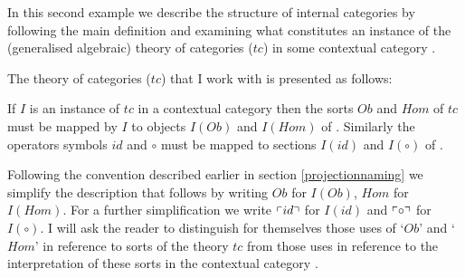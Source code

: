\newcommand{\compmorph}{\text{`$\circ$\kern-2pt'}}%

\newcommand{\ccplaceholder}{\rule[-0.2cm]{0cm}{0.6cm}\kern0.2cm}
\newcommand{\rightend}[1] { \kern-0.2cm\Rnode{#1} {\ccplaceholder} }

In this second example we describe the structure of internal categories by following the main definition and examining
what constitutes an instance of the (generalised algebraic) theory of categories ($tc$) in some 
 contextual category \catc.

The theory of categories ($tc$) that I work with is presented as follows:


\iffalse
\begin{gatrules}
\gatintros
\gatintroducing{Ob}
\isT{Ob} \\
\gatintroducing{Hom}
  \gatsingular{\ofT{x_1,x_2}{Ob}}{\isT{Hom(x_1,x_2)}} \\	
\gatintroducing{id}
  \gatsingular{\ofT{w}{Ob}}{\ofT{id(w)}{Hom(w,w)}} \\	
\gataxioms
\gatintroducing{  \gataxiomno{1} \\   \gataxiomno{2}}
\begin{gatgroup}{\ofT{f}{Hom(x_1,x_2)},\ \ofT{x_1,x_2}{Ob}}
    \gatleaf{}{id_{x_1} \circ f = f} \\
    \gatleaf{}{f \circ id_{x_2} = f}
\end{gatgroup} \\
\gatintroducing{ \gataxiomno{3} }
\gatsingular{\associativitypremisereversed}{(f \circ g) \circ h = f \circ (g \circ h)} 
\end{gatrules}
\fi

If $I$ is an instance of $tc$ in a contextual category \catcw then the sorts $Ob$ and $Hom$ of $tc$ 
must be mapped by $I$  to objects $I(Ob)$ and  $I(Hom)$ of \catc.
Similarly  the operators symbols
$id$ and $\circ$ must be mapped to sections $I(id)$ and $I(\circ)$ of \catc.

Following the convention described earlier in section \ref{projectionnaming} we simplify  
the description that follows by writing $Ob$ for $I(Ob)$, $Hom$ for $I(Hom)$.
For a further simplification we write $\left\ulcorner id\right\urcorner$ for $I(id)$ and   $\left\ulcorner\circ\right\urcorner$ for $I(\circ)$.   I will ask the reader  to distinguish for themselves 
those uses of `$Ob$' and `$Hom$' in reference to sorts of the theory $tc$ from those uses in reference to the interpretation of these sorts in the contextual category \catc. 

